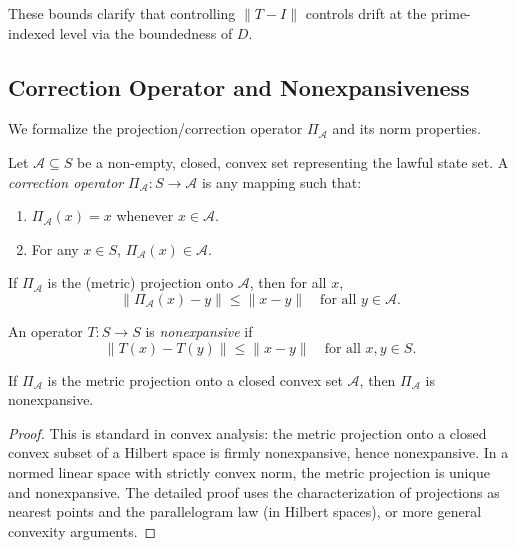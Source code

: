 \documentclass[11pt]{article}
\begin{document}
These bounds clarify that controlling \(\|T - I\|\) controls drift at the prime-indexed level via the boundedness of \(D\).

\subsection{Correction Operator and Nonexpansiveness}

We formalize the projection/correction operator \(\Pi_{\mathcal{A}}\) and its norm properties.

\begin{definition}
Let \(\mathcal{A} \subseteq S\) be a non-empty, closed, convex set representing the lawful state set. A \emph{correction operator}
\(\Pi_{\mathcal{A}} : S \to \mathcal{A}\) is any mapping such that:
\begin{enumerate}
  \item \(\Pi_{\mathcal{A}}(x) = x\) whenever \(x \in \mathcal{A}\).
  \item For any \(x \in S\), \(\Pi_{\mathcal{A}}(x) \in \mathcal{A}\).
\end{enumerate}
If \(\Pi_{\mathcal{A}}\) is the (metric) projection onto \(\mathcal{A}\), then for all \(x\),
\[
  \|\Pi_{\mathcal{A}}(x) - y\| \le \|x - y\|
  \quad
  \text{for all } y \in \mathcal{A}.
\]
\end{definition}

\begin{definition}[Nonexpansiveness]
An operator \(T : S \to S\) is \emph{nonexpansive} if
\[
  \|T(x) - T(y)\| \le \|x - y\| \quad \text{for all } x,y \in S.
\]
\end{definition}

\begin{lemma}
\label{lem:projection-nonexpansive}
If \(\Pi_{\mathcal{A}}\) is the metric projection onto a closed convex set \(\mathcal{A}\), then \(\Pi_{\mathcal{A}}\) is nonexpansive.
\end{lemma}

\begin{proof}
This is standard in convex analysis: the metric projection onto a closed convex subset of a Hilbert space is firmly nonexpansive, hence nonexpansive. In a normed linear space with strictly convex norm, the metric projection is unique and nonexpansive. The detailed proof uses the characterization of projections as nearest points and the parallelogram law (in Hilbert spaces), or more general convexity arguments.
\end{proof}
\end{document}
